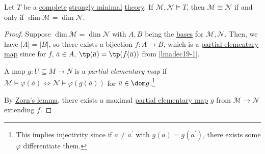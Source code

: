 \begin{theorem}
	Let \(T\) be a \hyperref[def:theory-complete]{complete} \hyperref[def:strongly-minimal]{strongly minimal} \hyperref[def:theory]{theory}. If \(\mathcal{M} , \mathcal{N} \models T\), then \(\mathcal{M} \cong \mathcal{N} \) if and only if \(\dim \mathcal{M} = \dim \mathcal{N} \).
\end{theorem}
\begin{proof}
	Suppose \(\dim \mathcal{M} = \dim \mathcal{N} \) with \(A, B\) being the \hyperref[def:basis]{bases} for \(\mathcal{M} , \mathcal{N} \). Then, we have \(\vert A \vert = \vert B \vert \), so there exists a bijection \(f\colon A \to B\), which is a \hyperref[def:partial-elementary-map]{partial elementary map} since for \(f\), \(\overline{a} \in A\), \(\tp(\overline{a} ) = \tp(f(\overline{a} ))\) from \autoref{lma:lec19-1}.

	\begin{definition}\label{def:partial-elementary-map}
		A map \(g \colon U \subseteq M \to N\) is a \emph{partial elementary map} if \(\mathcal{M} \models \varphi (\overline{a} ) \iff \mathcal{N} \models \varphi (g(\overline{a} ))\) for \(\overline{a} \in \dom g\).\footnote{This implies injectivity since if \(\overline{a} \neq \overline{a} ^{\prime} \) with \(g(\overline{a} ) = g(\overline{a} ^{\prime} )\), there exists some \(\varphi \) differentiate them.}
	\end{definition}

	By \hyperref[thm:Zorn]{Zorn's lemma}, there exists a maximal \hyperref[def:partial-elementary-map]{partial elementary map} \(g\) from \(\mathcal{M} \to  \mathcal{N} \) extending \(f\).


\end{proof}
